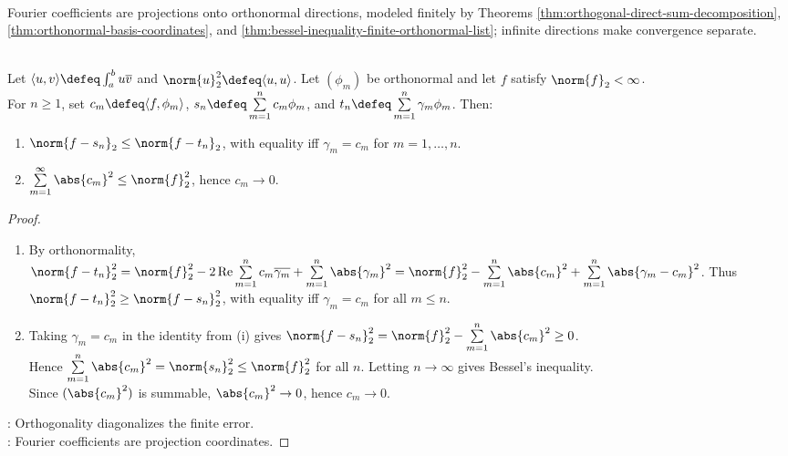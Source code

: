 \begin{perspective} \label{per:fourier-coefficients-as-projections} \\
Fourier coefficients are projections onto orthonormal directions, modeled finitely by Theorems \ref{thm:orthogonal-direct-sum-decomposition}, \ref{thm:orthonormal-basis-coordinates}, and \ref{thm:bessel-inequality-finite-orthonormal-list}; infinite directions make convergence separate.
\end{perspective}

\begin{theorem} \label{thm:orthonormal-fourier-best-approximation-bessel} \\
Let $\langle u,v\rangle\defeq\int_a^b u\overline v$ and $\norm{u}_2^2\defeq\langle u,u\rangle$. Let $(\phi_m)$ be orthonormal and let $f$ satisfy $\norm{f}_2<\infty$.\\
For $n\geq1$, set $c_m\defeq\langle f,\phi_m\rangle$, $s_n\defeq\sum\limits_{m=1}^{n}c_m\phi_m$, and $t_n\defeq\sum\limits_{m=1}^{n}\gamma_m\phi_m$. Then:
\begin{enumerate}[label=(\roman*)]
\setlength{\itemsep}{0pt}
\item $\norm{f-s_n}_2\leq\norm{f-t_n}_2$, with equality iff $\gamma_m=c_m$ for $m=1,\ldots,n$.
\item $\sum\limits_{m=1}^{\infty}\abs{c_m}^2\leq\norm{f}_2^2$, hence $c_m\to0$.
\end{enumerate}
\begin{proof}
\begin{enumerate}[label=(\roman*)]
\setlength{\itemsep}{0pt}
\item By orthonormality, $\norm{f-t_n}_2^2=\norm{f}_2^2-2\operatorname{Re}\sum\limits_{m=1}^{n}c_m\overline{\gamma_m}+\sum\limits_{m=1}^{n}\abs{\gamma_m}^2=\norm{f}_2^2-\sum\limits_{m=1}^{n}\abs{c_m}^2+\sum\limits_{m=1}^{n}\abs{\gamma_m-c_m}^2$. Thus $\norm{f-t_n}_2^2\geq\norm{f-s_n}_2^2$, with equality iff $\gamma_m=c_m$ for all $m\leq n$.
\item Taking $\gamma_m=c_m$ in the identity from (i) gives $\norm{f-s_n}_2^2=\norm{f}_2^2-\sum\limits_{m=1}^{n}\abs{c_m}^2\geq0$.\\
Hence $\sum\limits_{m=1}^{n}\abs{c_m}^2=\norm{s_n}_2^2\leq\norm{f}_2^2$ for all $n$. Letting $n\to\infty$ gives Bessel's inequality.\\
Since $(\abs{c_m}^2)$ is summable, $\abs{c_m}^2\to0$, hence $c_m\to0$.
\end{enumerate}
: Orthogonality diagonalizes the finite error.\\
: Fourier coefficients are projection coordinates.
\end{proof}
\end{theorem}


